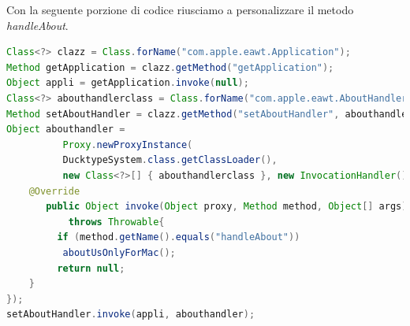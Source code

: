 Con la seguente porzione di codice riusciamo a personalizzare il metodo \emph{handleAbout}.
\begin{lstlisting}[language=java]
Class<?> clazz = Class.forName("com.apple.eawt.Application");
Method getApplication = clazz.getMethod("getApplication");
Object appli = getApplication.invoke(null);
Class<?> abouthandlerclass = Class.forName("com.apple.eawt.AboutHandler");
Method setAboutHandler = clazz.getMethod("setAboutHandler", abouthandlerclass);
Object abouthandler = 
          Proxy.newProxyInstance(
          DucktypeSystem.class.getClassLoader(),
          new Class<?>[] { abouthandlerclass }, new InvocationHandler(){
    @Override
       public Object invoke(Object proxy, Method method, Object[] args)
           throws Throwable{
         if (method.getName().equals("handleAbout"))
          aboutUsOnlyForMac();
         return null;
    }
});
setAboutHandler.invoke(appli, abouthandler);
\end{lstlisting}


